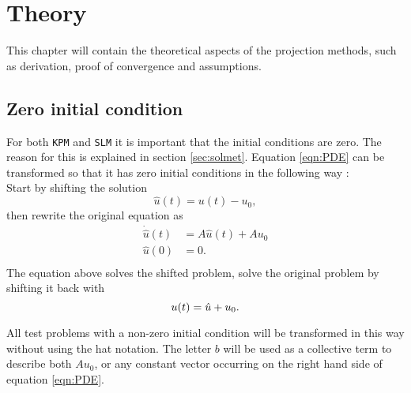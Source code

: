 \chapter{Theory}
This chapter will contain the theoretical aspects of the projection methods, such as derivation, proof of convergence and assumptions. 
 
\section{Zero initial condition}%
\label{sec:inittransf}
For both \texttt{KPM} and \texttt{SLM} it is important that the initial conditions are zero. The reason for this is explained in section \ref{sec:solmet}. Equation \eqref{eqn:PDE} can be transformed so that it has zero initial conditions in the following way \cite{zerotransf}: \\
Start by shifting the solution
\begin{equation*}
\hat{u}(t) = u(t)-u_0,
\end{equation*}
then rewrite the original equation as
\begin{equation*}
\begin{aligned}
\dot{\hat{u}}(t) &= A \hat{u}(t) +A u_0\\
 \hat{u}(0)&= 0. \\
\end{aligned}
\end{equation*}
The equation above solves the shifted problem, solve the original problem by shifting it back with
\begin{equation*}
 u(t) = \hat{u} + u_0. \\
\end{equation*}


All test problems with a non-zero initial condition will be transformed in this way without using the hat notation. The letter $b$ will be used as a collective term to describe both $A u_0$, or any constant vector occurring on the right hand side of equation \eqref{eqn:PDE}.

